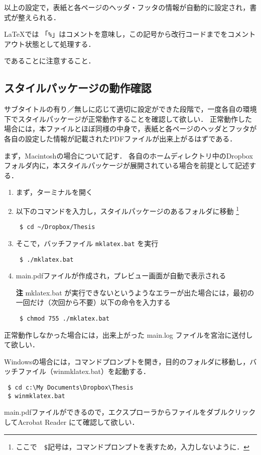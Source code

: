 以上の設定で，表紙と各ページのヘッダ・フッタの情報が自動的に設定され，書式が整えられる．
\begin{boxnote}
\LaTeX では 「\verb+%+」はコメントを意味し，この記号から改行コードまでをコメントアウト状態として処理する．
\end{boxnote}
であることに注意すること．

\subsection{スタイルパッケージの動作確認}
サブタイトルの有り／無しに応じて適切に設定ができた段階で，一度各自の環境下でスタイルパッケージが正常動作することを確認して欲しい．
正常動作した場合には，本ファイルとほぼ同様の中身で，表紙と各ページのヘッダとフッタが各自の設定した情報が記載されたPDFファイルが出来上がるはずである．

まず，Macintoshの場合について記す．
各自のホームディレクトリ中のDropboxフォルダ内に，本スタイルパッケージが展開されている場合を前提として記述する．
\begin{enumerate}
\item まず，ターミナルを開く
\item 以下のコマンドを入力し，スタイルパッケージのあるフォルダに移動
\footnote{ここで　\verb+$+記号は，コマンドプロンプトを表すため，入力しないように．}
\begin{screen}
{\small
\begin{verbatim}
 $ cd ~/Dropbox/Thesis
\end{verbatim}
}
\end{screen}

\item そこで，バッチファイル \verb+mklatex.bat+ を実行
\begin{screen}
{\small
\begin{verbatim}
 $ ./mklatex.bat
\end{verbatim}
}
\end{screen}

\item main.pdfファイルが作成され，プレビュー画面が自動で表示される
\item[\textbf{注}] mklatex.bat が実行できないというようなエラーが出た場合には，最初の一回だけ（次回から不要）以下の命令を入力する
\begin{screen}
{\small
\begin{verbatim}
 $ chmod 755 ./mklatex.bat
\end{verbatim}
}
\end{screen}
\end{enumerate}

正常動作しなかった場合には，出来上がった main.log ファイルを宮治に送付して欲しい．

Windowsの場合には，コマンドプロンプトを開き，目的のフォルダに移動し，バッチファイル（winmklatex.bat）を起動する．
\begin{screen}
{\small
\begin{verbatim}
 $ cd c:\My Documents\Dropbox\Thesis
 $ winmklatex.bat
\end{verbatim}
}
\end{screen}
main.pdfファイルができるので，エクスプローラからファイルをダブルクリックしてAcrobat Reader にて確認して欲しい．

